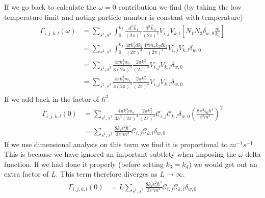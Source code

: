 If we go back to calculate the
\(\omega = 0\) contribution
we find (by taking the low
temperature limit and noting
particle number is constant
with temperature)
\begin{align}
  \Gamma_{i,j, k,l}(\omega) & =
  \sum_{s^1,s^3} \int_0^{k_f}
  \frac{d^3\vec{k}_1}{{(2\pi)}^3}
  \frac{d^3\vec{k}_3}{{(2\pi)}^3}
  V_{i,j} V_{k,l} [
  N_1 N_3 \delta_{w, 0} \frac{m}{k_3}] \\
                            & =
  \sum_{s^1,s^3} \int_0^{k_f}
  \frac{4\pi k_1^2 dk_1}{{(2\pi)}^3}
  \frac{4 \pi m_e k_3 dk_3}{{(2\pi)}^3}
  V_{i,j} V_{k,l} \delta_{w, 0}        \\
                            & =
  \sum_{s^1,s^3} \frac{4\pi k_f^3 m_e}{3{(2\pi)}^3}
  \frac{2 \pi k_f^2}{{(2\pi)}^3}
  V_{i,j} V_{k,l} \delta_{w, 0}        \\
                            & =
  \sum_{s^1,s^3} \frac{4\pi k_f^3 m_e}{3{(2\pi)}^3}
  \frac{2 \pi k_f^2}{{(2\pi)}^3}
  V_{i,j} V_{k,l} \delta_{w, 0}        \\
\end{align}
If we add back in the factor of  \(\hbar^3\)
\begin{align}
  \Gamma_{i,j, k,l}(0) & =
  \sum_{s^1,s^3} \frac{4\pi k_f^3 m_e}{3\hbar^3{(2\pi)}^3}
  \frac{2 \pi k_f^2}{{(2\pi)}^3}
  \mathcal{C}_{i,j} \mathcal{C}_{k,l}
  \delta_{w, 0} {(\frac{8 \pi^2 \epsilon_0 \hbar^4}{e^2 m^2})}^2 \\
                       & =
  \sum_{s^1,s^3}
  \frac{8k_f^5 \epsilon_0^2 \hbar^5}{3e^4 m^3}
  \mathcal{C}_{i,j} \mathcal{C}_{k,l} \delta_{w, 0}
\end{align}
If we use dimensional analysis on this term
we find it is proportional to \(m^{-1}s^{-1}\).
This is because we have ignored an important
subtlety when imposing the \(\omega \) delta
function. If we had done it properly (before
setting \(k_3 = k_4\)) we would get
out an extra factor of \(L\). This term
therefore diverges as \(L \rightarrow \infty \).
\begin{align}
  \Gamma_{i,j, k,l}(0) & =
  L \sum_{s^1,s^3}
  \frac{8k_f^5 \epsilon_0^2 \hbar^5}{3e^4 m^3}
  \mathcal{C}_{i,j} \mathcal{C}_{k,l} \delta_{w, 0}
  \label{eqn:divergent expression for first integral}
\end{align}